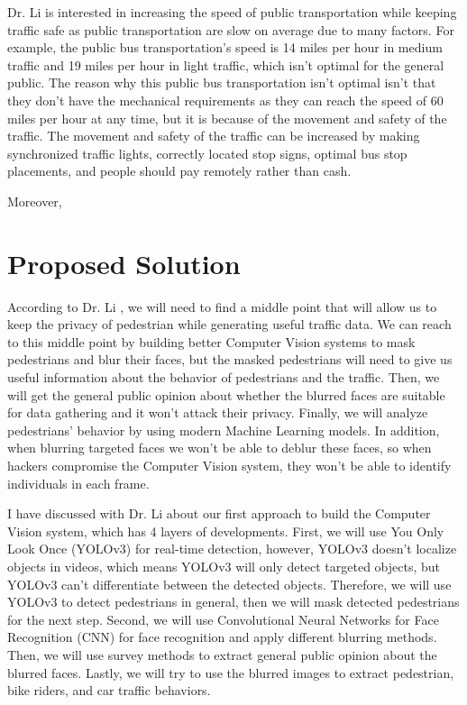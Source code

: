 \documentclass[onecolumn, draftclsnofoot,10pt, compsoc]{IEEEtran}
\begin{document}
Dr. Li \cite{li} is interested in increasing the speed of public transportation while keeping traffic safe as public transportation are slow on average due to many factors. For example, the public bus transportation's speed is 14 miles per hour in medium traffic and 19 miles per hour in light traffic, which isn't optimal for the general public. The reason why this public bus transportation isn't optimal isn't that they don't have the mechanical requirements as they can reach the speed of 60 miles per hour at any time, but it is because of the movement and safety of the traffic. The movement and safety of the traffic can be increased by making synchronized traffic lights, correctly located stop signs, optimal bus stop placements, and people should pay remotely rather than cash.



Moreover, 
\section{Proposed Solution}

According to Dr. Li \cite{li}, we will need to find a middle point that will allow us to keep the privacy of pedestrian while generating useful traffic data. We can reach to this middle point by building better Computer Vision systems to mask pedestrians and blur their faces, but the masked pedestrians will need to give us useful information about the behavior of pedestrians and the traffic. Then, we will get the general public opinion about whether the blurred faces are suitable for data gathering and it won't attack their privacy. Finally, we will analyze pedestrians' behavior by using modern Machine Learning models. In addition, when blurring targeted faces we won't be able to deblur these faces, so when hackers compromise the Computer Vision system, they won't be able to identify individuals in each frame.

I have discussed with Dr. Li \cite{li} about our first approach to build the Computer Vision system, which has 4 layers of developments. First, we will use You Only Look Once (YOLOv3) \cite{YOLOv3} for real-time detection, however, YOLOv3 \cite{YOLOv3} doesn't localize objects in videos, which means YOLOv3 \cite{YOLOv3} will only detect targeted objects, but YOLOv3 \cite{YOLOv3} can't differentiate between the detected objects. Therefore, we will use YOLOv3 \cite{YOLOv3} to detect pedestrians in general, then we will mask detected pedestrians for the next step. Second, we will use  Convolutional Neural Networks for Face Recognition (CNN) \cite{CNN} for face recognition and apply different blurring methods. Then, we will use survey methods to extract general public opinion about the blurred faces. Lastly, we will try to use the blurred images to extract pedestrian, bike riders, and car traffic behaviors.
\end{document}
